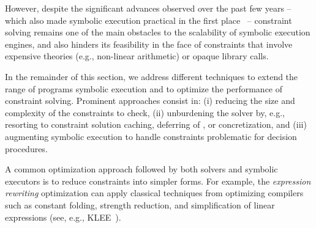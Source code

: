 However, despite the significant advances observed over the past few years -- which also made symbolic execution practical in the first place~\cite{CS-CACM13} -- constraint solving remains one of the main obstacles to the scalability of symbolic execution engines, and also hinders its feasibility in the face of constraints that involve expensive theories (e.g., non-linear arithmetic) or opaque library calls.


In the remainder of this section, we address different techniques to extend the range of programs  symbolic execution and to optimize the performance of constraint solving. Prominent approaches consist in: (i) reducing the size and complexity of the constraints to check, (ii) unburdening the solver by, e.g., resorting to constraint solution caching, deferring of , or concretization, and (iii) augmenting symbolic execution to handle constraints problematic for decision procedures.




A common optimization approach followed by both solvers and symbolic executors is to reduce constraints into simpler forms. For example, the {\em expression rewriting} optimization can apply classical techniques from optimizing compilers such as constant folding, strength reduction, and simplification of linear expressions (see, e.g., {\sc KLEE}~\cite{KLEE-OSDI08}).

